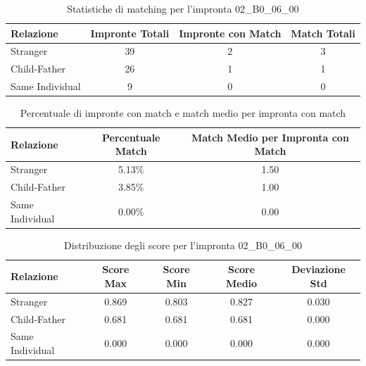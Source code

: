 \begin{table}[htbp]
\centering
\caption{Statistiche di matching per l'impronta 02\_B0\_06\_00}
\label{tab:results_02_B0_06_00}
\begin{tabular}{|l|c|c|c|}
\hline
\textbf{Relazione} & \textbf{Impronte Totali} & \textbf{Impronte con Match} & \textbf{Match Totali} \\
\hline
Stranger & 39 & 2 & 3 \\
\hline
Child-Father & 26 & 1 & 1 \\
\hline
Same Individual & 9 & 0 & 0 \\
\hline
\end{tabular}
\end{table}


\begin{table}[htbp]
\centering
\caption{Percentuale di impronte con match e match medio per impronta con match}
\label{tab:match_percentage_02_B0_06_00}
\begin{tabular}{|l|c|c|}
\hline
\textbf{Relazione} & \textbf{Percentuale Match} & \textbf{Match Medio per Impronta con Match} \\
\hline
Stranger & 5.13\% & 1.50 \\
\hline
Child-Father & 3.85\% & 1.00 \\
\hline
Same Individual & 0.00\% & 0.00 \\
\hline
\end{tabular}
\end{table}


\begin{table}[htbp]
\centering
\caption{Distribuzione degli score per l'impronta 02\_B0\_06\_00}
\label{tab:scores_02_B0_06_00}
\begin{tabular}{|l|c|c|c|c|}
\hline
\textbf{Relazione} & \textbf{Score Max} & \textbf{Score Min} & \textbf{Score Medio} & \textbf{Deviazione Std} \\
\hline
Stranger & 0.869 & 0.803 & 0.827 & 0.030 \\
\hline
Child-Father & 0.681 & 0.681 & 0.681 & 0.000 \\
\hline
Same Individual & 0.000 & 0.000 & 0.000 & 0.000 \\
\hline
\end{tabular}
\end{table}

